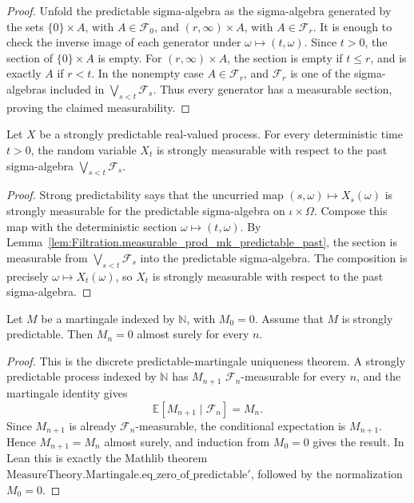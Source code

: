 \begin{proof}
Unfold the predictable sigma-algebra as the sigma-algebra generated by the
sets \(\{0\}\times A\), with \(A\in\mathcal F_0\), and
\((r,\infty)\times A\), with \(A\in\mathcal F_r\).  It is enough to check
the inverse image of each generator under \(\omega\mapsto(t,\omega)\).
Since \(t>0\), the section of \(\{0\}\times A\) is empty.  For
\((r,\infty)\times A\), the section is empty if \(t\le r\), and is exactly
\(A\) if \(r<t\).  In the nonempty case \(A\in\mathcal F_r\), and
\(\mathcal F_r\) is one of the sigma-algebras included in
\(\bigvee_{s<t}\mathcal F_s\).  Thus every generator has a measurable
section, proving the claimed measurability.
\end{proof}


\begin{lemma}\label{lem:IsStronglyPredictable.stronglyMeasurable_past}
Let \(X\) be a strongly predictable real-valued process.  For every
deterministic time \(t>0\), the random variable \(X_t\) is strongly
measurable with respect to the past sigma-algebra
\(\bigvee_{s<t}\mathcal F_s\).
\end{lemma}

\begin{proof}
Strong predictability says that the uncurried map
\((s,\omega)\mapsto X_s(\omega)\) is strongly measurable for the predictable
sigma-algebra on \(\iota\times\Omega\).  Compose this map with the
deterministic section \(\omega\mapsto(t,\omega)\).  By
Lemma~\ref{lem:Filtration.measurable_prod_mk_predictable_past}, the section
is measurable from \(\bigvee_{s<t}\mathcal F_s\) into the predictable
sigma-algebra.  The composition is precisely \(\omega\mapsto X_t(\omega)\),
so \(X_t\) is strongly measurable with respect to the past sigma-algebra.
\end{proof}


\begin{theorem}\label{thm:Martingale.eq_zero_of_predictable_finiteVariation_discrete}
Let \(M\) be a martingale indexed by \(\mathbb N\), with \(M_0=0\).
Assume that \(M\) is strongly predictable.  Then \(M_n=0\) almost surely
for every \(n\).
\end{theorem}

\begin{proof}
This is the discrete predictable-martingale uniqueness theorem.  A strongly
predictable process indexed by \(\mathbb N\) has \(M_{n+1}\)
\(\mathcal F_n\)-measurable for every \(n\), and the martingale identity gives
\[
  \mathbb E[M_{n+1}\mid\mathcal F_n]=M_n .
\]
Since \(M_{n+1}\) is already \(\mathcal F_n\)-measurable, the conditional
expectation is \(M_{n+1}\).  Hence \(M_{n+1}=M_n\) almost surely, and induction
from \(M_0=0\) gives the result.  In Lean this is exactly the Mathlib theorem
\(\mathrm{MeasureTheory.Martingale.eq\_zero\_of\_predictable'}\), followed by
the normalization \(M_0=0\).
\end{proof}


